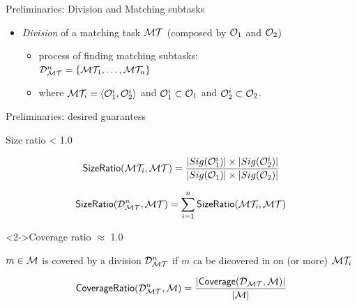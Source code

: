 \documentclass[t]{beamer}
\begin{document}
\begin{frame}{Preliminaries: Division and Matching subtasks}
	
  		\begin{itemize}    
  		 
  		  \item \emph{Division} of a matching task $\mathcal{M}\mathcal{T}$ (composed by
$\mathcal{O}_1$ and $\mathcal{O}_2$) 
		\begin{itemize}
			\item process of finding matching subtasks: \\
			$\mathcal{D}_{\mathcal{M}\mathcal{T}}^{n}=\{\mathcal{M}\mathcal{T}_1,\ldots,\mathcal{M}\mathcal{T}_n\}$
			\item where $\mathcal{M}\mathcal{T}_{i}=\langle \mathcal{O}_1^{i}, \mathcal{O}_2^{i} \rangle$ and  $\mathcal{O}_1^{i} \subset \mathcal{O}_1$ and $\mathcal{O}_2^{i} \subset
\mathcal{O}_2$. 
		\end{itemize}
  	
  	
		\end{itemize}
  	
\end{frame}



\begin{frame}{Preliminaries: desired guarantess}
	
	\begin{block}{Size ratio < 1.0}
	
	\begin{equation*}
    	\mathsf{SizeRatio}(\mathcal{M}\mathcal{T}_i, \mathcal{M}\mathcal{T}) = \frac{\lvert Sig(\mathcal{O}_1^{i}) \rvert
    	\times \lvert Sig(\mathcal{O}_2^{i}) \rvert} {\lvert Sig(\mathcal{O}_1) \rvert \times
    	\lvert Sig(\mathcal{O}_2)\rvert}
	\end{equation*}

	\begin{equation*}
    	\mathsf{SizeRatio}(\mathcal{D}_{\mathcal{M}\mathcal{T}}^{n}, \mathcal{M}\mathcal{T}) =
    	\sum_{i=1}^{n}\mathsf{SizeRatio}(\mathcal{M}\mathcal{T}_i, \mathcal{M}\mathcal{T})
	\end{equation*}
	
	
	\end{block}
	
  	
  	\begin{block}<2->{Coverage ratio $\approx$ 1.0}
  	
  	$m\in\mathcal{M}$ is covered by a division $\mathcal{D}_{\mathcal{M}\mathcal{T}}^{n}$  if $m$ ca be dicovered in
  	on (or more) $\mathcal{M}\mathcal{T}_i$
  	
	  	\begin{equation*}
	    \mathsf{CoverageRatio}(\mathcal{D}_{\mathcal{M}\mathcal{T}}^{n}, \mathcal{M}) =
	    \frac{\lvert\mathsf{Coverage}(\mathcal{D}_{\mathcal{M}\mathcal{T}}, \mathcal{M})\rvert} {\lvert \mathcal{M} \rvert}
		\end{equation*}
  	\end{block}
  	
  	
\end{frame}
\end{document}
